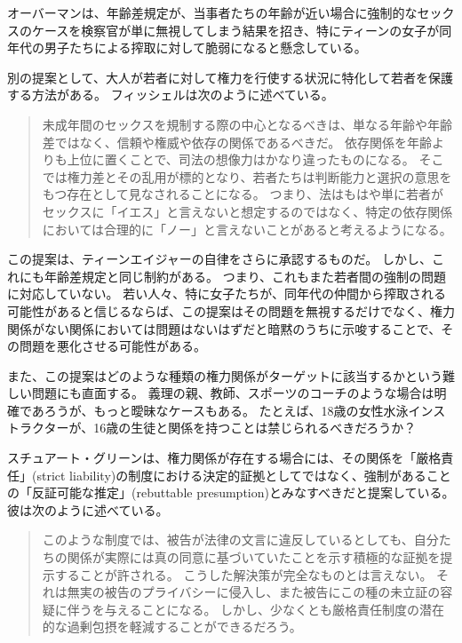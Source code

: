 \documentclass[paper=a4,book,openany]{jlreq}
\newcommand{\ig}[1]{}           %
\begin{document}
オーバーマンは、年齢差規定が、当事者たちの年齢が近い場合に強制的なセックスのケースを検察官が単に無視してしまう結果を招き、特にティーンの女子が同年代の男子たちによる搾取に対して脆弱になると懸念している\citep[p.751]{oberman01:_girls_master_house}。

別の提案として、大人が若者に対して権力を行使する状況に特化して若者を保護する方法がある。
フィッシェルは次のように述べている。

\begin{quote}
未成年間のセックスを規制する際の中心となるべきは、単なる年齢や年齢差ではなく、信頼や権威や依存の関係であるべきだ。
依存関係を年齢よりも上位に置くことで、司法の想像力はかなり違ったものになる。
そこでは権力差とその乱用が標的となり、若者たちは判断能力と選択の意思をもつ存在として見なされることになる。
つまり、法はもはや単に若者がセックスに「イエス」と言えないと想定するのではなく、特定の依存関係においては合理的に「ノー」と言えないことがあると考えるようになる。
\citep[pp.315--316]{fischel10:_per_se_power}
\end{quote}

この提案は、ティーンエイジャーの自律をさらに承認するものだ。
しかし、これにも年齢差規定と同じ制約がある。
つまり、これもまた若者間の強制の問題に対応していない。
若い人々、特に女子たちが、同年代の仲間から搾取される可能性があると信じるならば、この提案はその問題を無視するだけでなく、権力関係がない関係においては問題はないはずだと暗黙のうちに示唆することで、その問題を悪化させる可能性がある。

また、この提案はどのような種類の権力関係がターゲットに該当するかという難しい問題にも直面する。
義理の親、教師、スポーツのコーチのような場合は明確であろうが、もっと曖昧なケースもある。
たとえば、18歳の女性水泳インストラクターが、16歳の生徒と関係を持つことは禁じられるべきだろうか？

スチュアート・グリーン\ig{Stuart Green}は、権力関係が存在する場合には、その関係を「厳格責任」(strict liability)の制度における決定的証拠としてではなく、強制があることの「反証可能な推定」(rebuttable presumption)とみなすべきだと提案している。
彼は次のように述べている。

\begin{quote}
このような制度では、被告が法律の文言に違反しているとしても、自分たちの関係が実際には真の同意に基づいていたことを示す積極的な証拠を提示することが許される。
こうした解決策が完全なものとは言えない。
それは無実の被告のプライバシーに侵入し、また被告にこの種の未立証の容疑に伴うを与えることになる。
しかし、少なくとも厳格責任制度の潜在的な過剰包摂を軽減することができるだろう。
\citep{green17:_how_crimin_inces}
\end{quote}
\end{document}
